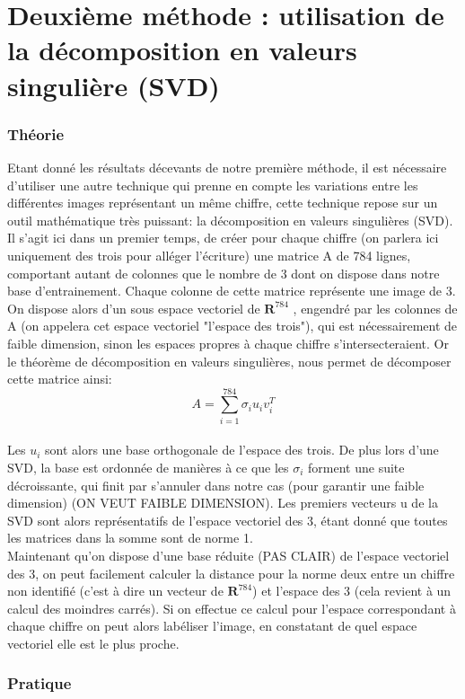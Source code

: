 \documentclass[a4paper,11pt,twoside]{report}
\begin{document}
\chapter{Deuxième méthode : utilisation de la décomposition en valeurs singulière (SVD)}
\subsection{Théorie}
Etant donné les résultats décevants de notre première méthode, il est nécessaire d'utiliser une autre technique qui prenne en compte les variations entre les différentes images représentant un même chiffre, cette technique repose sur un outil mathématique très puissant: la décomposition en valeurs singulières (SVD).\\
Il s'agit ici dans un premier temps, de créer pour chaque chiffre (on parlera ici uniquement des trois pour alléger l'écriture) une matrice A de 784 lignes, comportant autant de colonnes que le nombre de 3 dont on dispose dans notre base d'entrainement. Chaque colonne de cette matrice représente une image de 3. On dispose alors d'un sous espace vectoriel de $\textbf{R}^{784}$ , engendré par les colonnes de A (on appelera cet espace vectoriel "l'espace des trois"), qui est nécessairement de faible dimension, sinon les espaces propres à chaque chiffre s'intersecteraient. Or le théorème de décomposition en valeurs singulières, nous permet de décomposer cette matrice ainsi: $$A = \sum_{i=1}^{784}{\sigma_{i}u_{i}v_{i}^{T}}$$\\
Les $u_{i}$ sont alors une base orthogonale de l'espace des trois. De plus lors d'une SVD, la base est ordonnée de manières à ce que les $\sigma_{i}$ forment une suite décroissante, qui finit par s'annuler dans notre cas (pour garantir une faible dimension) (ON VEUT FAIBLE DIMENSION). Les premiers vecteurs u de la SVD sont alors représentatifs de l'espace vectoriel des 3, étant donné que toutes les matrices dans la somme sont de norme 1.\\
Maintenant qu'on dispose d'une base réduite (PAS CLAIR) de l'espace vectoriel des 3, on peut facilement calculer la distance pour la norme deux entre un chiffre non identifié (c'est à dire un vecteur de  $\textbf{R}^{784}$) et l'espace des 3 (cela revient à un calcul des moindres carrés). Si on effectue ce calcul pour l'espace correspondant à chaque chiffre on peut alors labéliser l'image, en constatant de quel espace vectoriel elle est le plus proche.

\subsection{Pratique}
\end{document}
